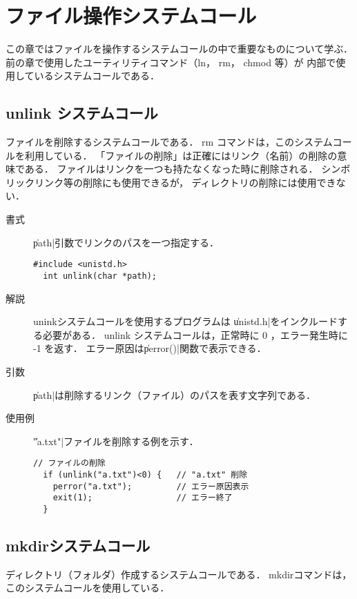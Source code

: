\chapter{ファイル操作システムコール}

この章ではファイルを操作するシステムコールの中で重要なものについて学ぶ．
前の章で使用したユーティリティコマンド（ln， rm， chmod 等）が
内部で使用しているシステムコールである．

\section{unlink システムコール}
ファイルを削除するシステムコールである．
rm コマンドは，このシステムコールを利用している．
「ファイルの削除」は正確にはリンク（名前）の削除の意味である．
ファイルはリンクを一つも持たなくなった時に削除される．
シンボリックリンク等の削除にも使用できるが，
ディレクトリの削除には使用できない．

\begin{description}
\item[書式] \|path|引数でリンクのパスを一つ指定する．
\begin{lstlisting}[numbers=none]
  #include <unistd.h>
  int unlink(char *path);
\end{lstlisting}

\item[解説] uninkシステムコールを使用するプログラムは
\|unistd.h|をインクルードする必要がある．
unlink システムコールは，正常時に 0 ，エラー発生時に -1 を返す．
エラー原因は\|perror()|関数で表示できる．

\item[引数] \|path|は削除するリンク（ファイル）のパスを表す文字列である．

\item[使用例] \|"a.txt"|ファイルを削除する例を示す．
\begin{lstlisting}[numbers=none]
  // ファイルの削除
  if (unlink("a.txt")<0) {   // "a.txt" 削除
    perror("a.txt");         // エラー原因表示
    exit(1);                 // エラー終了
  }
\end{lstlisting}
\end{description}

\section{mkdirシステムコール}
ディレクトリ（フォルダ）作成するシステムコールである．
mkdirコマンドは，このシステムコールを使用している．

